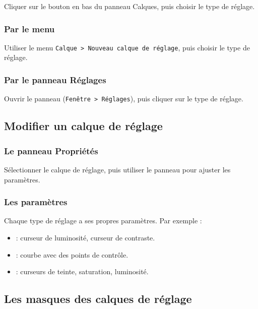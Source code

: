 Cliquer sur le bouton  en bas du panneau Calques, puis choisir le type de réglage.

\subsubsection{Par le menu}

Utiliser le menu \texttt{Calque > Nouveau calque de réglage}, puis choisir le type de réglage.

\subsubsection{Par le panneau Réglages}

Ouvrir le panneau  (\texttt{Fenêtre > Réglages}), puis cliquer sur le type de réglage.

\subsection{Modifier un calque de réglage}

\subsubsection{Le panneau Propriétés}

Sélectionner le calque de réglage, puis utiliser le panneau  pour ajuster les paramètres.

\subsubsection{Les paramètres}

Chaque type de réglage a ses propres paramètres. Par exemple :

\begin{itemize}
    \item {} : curseur de luminosité, curseur de contraste.
    \item {} : courbe avec des points de contrôle.
    \item {} : curseurs de teinte, saturation, luminosité.
\end{itemize}

\subsection{Les masques des calques de réglage}

